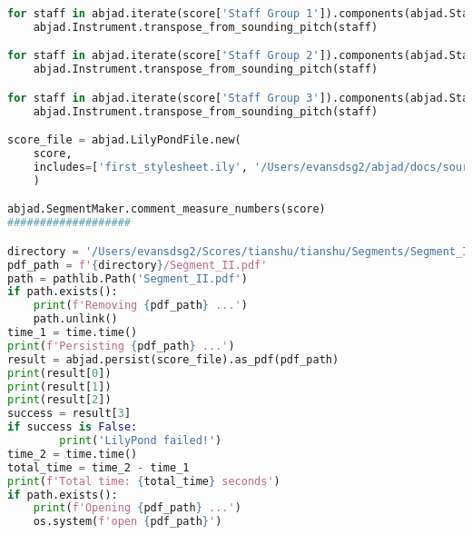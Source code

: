 \begin{lstlisting}[language=Python, caption=Tianshu Segment\_II]
for staff in abjad.iterate(score['Staff Group 1']).components(abjad.Staff):
    abjad.Instrument.transpose_from_sounding_pitch(staff)

for staff in abjad.iterate(score['Staff Group 2']).components(abjad.Staff):
    abjad.Instrument.transpose_from_sounding_pitch(staff)

for staff in abjad.iterate(score['Staff Group 3']).components(abjad.Staff):
    abjad.Instrument.transpose_from_sounding_pitch(staff)

score_file = abjad.LilyPondFile.new(
    score,
    includes=['first_stylesheet.ily', '/Users/evansdsg2/abjad/docs/source/_stylesheets/abjad.ily'],
    )

abjad.SegmentMaker.comment_measure_numbers(score)
###################

directory = '/Users/evansdsg2/Scores/tianshu/tianshu/Segments/Segment_II'
pdf_path = f'{directory}/Segment_II.pdf'
path = pathlib.Path('Segment_II.pdf')
if path.exists():
    print(f'Removing {pdf_path} ...')
    path.unlink()
time_1 = time.time()
print(f'Persisting {pdf_path} ...')
result = abjad.persist(score_file).as_pdf(pdf_path)
print(result[0])
print(result[1])
print(result[2])
success = result[3]
if success is False:
        print('LilyPond failed!')
time_2 = time.time()
total_time = time_2 - time_1
print(f'Total time: {total_time} seconds')
if path.exists():
    print(f'Opening {pdf_path} ...')
    os.system(f'open {pdf_path}')
\end{lstlisting}
\doublespace

